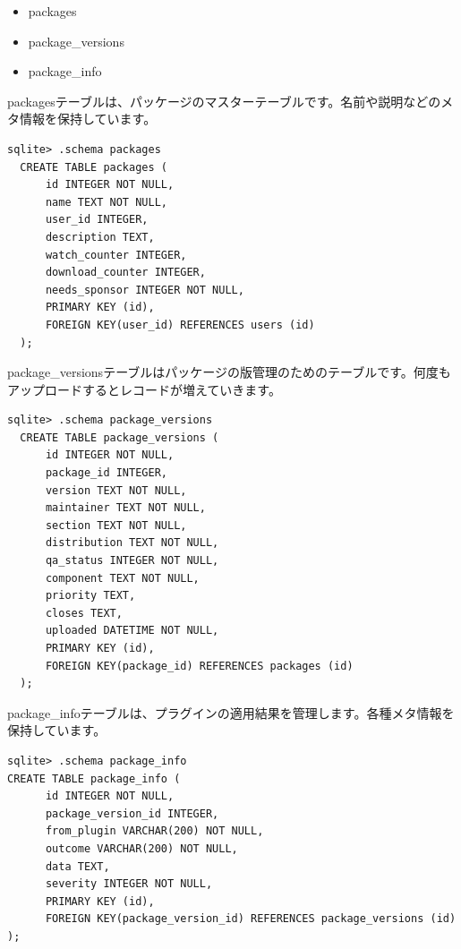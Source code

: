 \documentclass[mingoth,a4paper]{jsarticle}
\begin{document}
\begin{itemize}
  \item packages
  \item package\_versions
  \item package\_info
\end{itemize}

packagesテーブルは、パッケージのマスターテーブルです。名前や説明などのメタ情報を保持しています。

\begin{screen}
\begin{verbatim}
sqlite> .schema packages
  CREATE TABLE packages (
      id INTEGER NOT NULL, 
      name TEXT NOT NULL, 
      user_id INTEGER, 
      description TEXT, 
      watch_counter INTEGER, 
      download_counter INTEGER, 
      needs_sponsor INTEGER NOT NULL, 
      PRIMARY KEY (id), 
      FOREIGN KEY(user_id) REFERENCES users (id)
  );
\end{verbatim}
\end{screen}

package\_versionsテーブルはパッケージの版管理のためのテーブルです。何度もアップロードするとレコードが増えていきます。

\begin{screen}
\begin{verbatim}
sqlite> .schema package_versions
  CREATE TABLE package_versions (
      id INTEGER NOT NULL, 
      package_id INTEGER, 
      version TEXT NOT NULL, 
      maintainer TEXT NOT NULL, 
      section TEXT NOT NULL, 
      distribution TEXT NOT NULL, 
      qa_status INTEGER NOT NULL, 
      component TEXT NOT NULL, 
      priority TEXT, 
      closes TEXT, 
      uploaded DATETIME NOT NULL, 
      PRIMARY KEY (id), 
      FOREIGN KEY(package_id) REFERENCES packages (id)
  );
\end{verbatim}
\end{screen}

package\_infoテーブルは、プラグインの適用結果を管理します。各種メタ情報を保持しています。

\begin{screen}
\begin{verbatim}
sqlite> .schema package_info
CREATE TABLE package_info (
      id INTEGER NOT NULL, 
      package_version_id INTEGER, 
      from_plugin VARCHAR(200) NOT NULL, 
      outcome VARCHAR(200) NOT NULL, 
      data TEXT, 
      severity INTEGER NOT NULL, 
      PRIMARY KEY (id), 
      FOREIGN KEY(package_version_id) REFERENCES package_versions (id)
);
\end{verbatim}
\end{screen}
\end{document}
